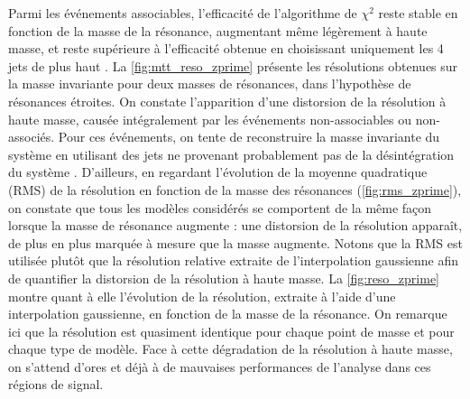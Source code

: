 Parmi les événements associables, l'efficacité de l'algorithme de $\chi^2$ reste stable en fonction de la masse de la résonance, augmentant même légèrement à haute masse, et reste supérieure à l'efficacité obtenue en choisissant uniquement les 4 jets de plus haut \pt. La \cref{fig:mtt_reso_zprime} présente les résolutions obtenues sur la masse invariante pour deux masses de résonances, dans l'hypothèse de résonances étroites. On constate l'apparition d'une distorsion de la résolution à haute masse, causée intégralement par les événements non-associables ou non-associés. Pour ces événements, on tente de reconstruire la masse invariante du système \ttbar en utilisant des jets ne provenant probablement pas de la désintégration du système \ttbar. D'ailleurs, en regardant l'évolution de la moyenne quadratique (RMS) de la résolution en fonction de la masse des résonances (\cref{fig:rms_zprime}), on constate que tous les modèles considérés se comportent de la même façon lorsque la masse de résonance augmente : une distorsion de la résolution apparaît, de plus en plus marquée à mesure que la masse augmente. Notons que la RMS est utilisée plutôt que la résolution relative extraite de l'interpolation gaussienne afin de quantifier la distorsion de la résolution à haute masse. La \cref{fig:reso_zprime} montre quant à elle l'évolution de la résolution, extraite à l'aide d'une interpolation gaussienne, en fonction de la masse de la résonance. On remarque ici que la résolution est quasiment identique pour chaque point de masse et pour chaque type de modèle. Face à cette dégradation de la résolution à haute masse, on s'attend d'ores et déjà à de mauvaises performances de l'analyse dans ces régions de signal.

